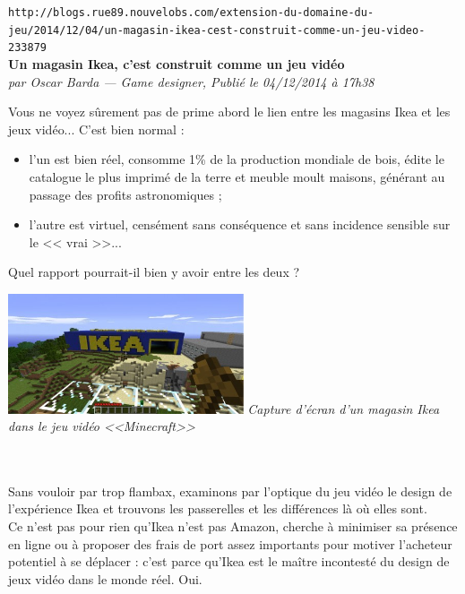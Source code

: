 \documentclass[11pt,twoside,a4paper]{article}
\begin{document}
\setlength\parindent{0pt}

\texttt{http://blogs.rue89.nouvelobs.com/extension-du-domaine-du-jeu/2014/12/04/un-magasin-ikea-cest-construit-comme-un-jeu-video-233879}~\\

\textbf{\Large Un magasin Ikea, c'est construit comme un jeu vid{\'e}o} ~\\

\emph{\small par Oscar Barda --- Game designer, Publi{\'e} le 04/12/2014 {\`a} 17h38} ~\\

\begin{minipage}[ht]{0.65\textwidth}
	Vous ne voyez s{\^u}rement pas de prime abord le lien entre les magasins Ikea et les jeux vid{\'e}o... C'est bien normal : ~\\
	\begin{itemize}
    	\item l'un est bien r{\'e}el, consomme 1\% de la production mondiale de bois, {\'e}dite le catalogue le plus imprim{\'e} de la terre et meuble moult maisons, g{\'e}n{\'e}rant au passage des profits astronomiques ;
    	\item l'autre est virtuel, cens{\'e}ment sans cons{\'e}quence et sans incidence sensible sur le << vrai >>...
	\end{itemize}
	Quel rapport pourrait-il bien y avoir entre les deux ? %
\end{minipage} \hfill \begin{minipage}[ht]{7.00cm}
	\includegraphics[width=6.95cm]{img/ikea.jpg}
	\emph{\footnotesize Capture d'{\'e}cran d'un magasin Ikea dans le jeu vid{\'e}o <<Minecraft>> }
\end{minipage}~\\~\\

Sans vouloir par trop flambax, examinons par l'optique du jeu vid{\'e}o le design de l'exp{\'e}rience Ikea et trouvons les passerelles et les diff{\'e}rences l{\`a} o{\`u} elles sont.~\\

Ce n'est pas pour rien qu'Ikea n'est pas Amazon, cherche {\`a} minimiser sa pr{\'e}sence en ligne ou {\`a} proposer des frais de port assez importants pour motiver l'acheteur potentiel {\`a} se d{\'e}placer : c'est parce qu'Ikea est le ma{\^i}tre incontest{\'e} du design de jeux vid{\'e}o dans le monde r{\'e}el. Oui.~\\
\end{document}
